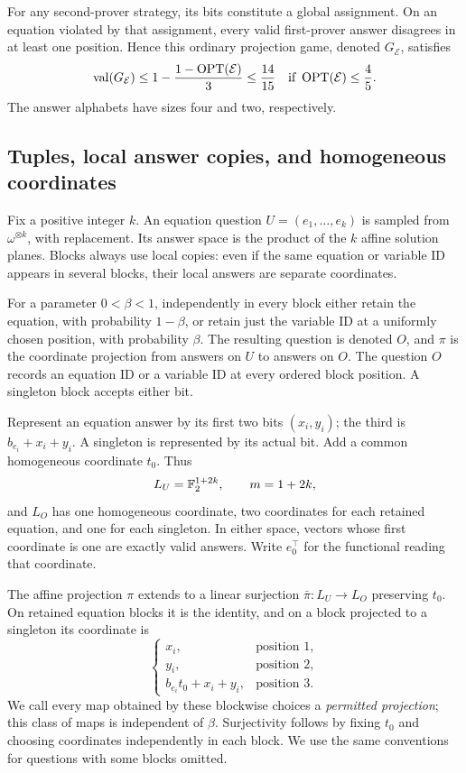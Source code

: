 For any second-prover strategy, its bits constitute a global assignment.
On an equation violated by that assignment, every valid first-prover
answer disagrees in at least one position.  Hence this ordinary
projection game, denoted \(G_{\mathcal E}\), satisfies
\begin{equation}
 \operatorname{val}(G_{\mathcal E})
 \le 1-\frac{1-\operatorname{OPT}(\mathcal E)}3
 \le \frac{14}{15}
 \quad\text{if }\operatorname{OPT}(\mathcal E)\le\frac45.
 \label{eq:base-game-gap}
\end{equation}
The answer alphabets have sizes four and two, respectively.

\subsection{Tuples, local answer copies, and homogeneous coordinates}

Fix a positive integer \(k\).  An equation question
\(U=(e_1,\ldots,e_k)\) is sampled from \(\omega^{\otimes k}\), with
replacement.  Its answer space is the product of the \(k\) affine
solution planes.  Blocks always use local copies: even if the same
equation or variable ID appears in several blocks, their local answers
are separate coordinates.

For a parameter \(0<\beta<1\), independently in every block either
retain the equation, with probability \(1-\beta\), or retain just the
variable ID at a uniformly chosen position, with probability \(\beta\).
The resulting question is denoted \(O\), and \(\pi\) is the
coordinate projection from answers on \(U\) to answers on \(O\).
The question \(O\) records an equation ID or a variable ID at every
ordered block position.  A singleton block accepts either bit.

Represent an equation answer by its first two bits \((x_i,y_i)\);
the third is \(b_{e_i}+x_i+y_i\).  A singleton is represented by its
actual bit.  Add a common homogeneous coordinate \(t_0\).  Thus
\[
 L_U=\mathbb F_2^{1+2k},\qquad m=1+2k,
\]
and \(L_O\) has one homogeneous coordinate, two coordinates for each
retained equation, and one for each singleton.  In either space, vectors
whose first coordinate is one are exactly valid answers.  Write
\(e_0^\top\) for the functional reading that coordinate.

The affine projection \(\pi\) extends to a linear surjection
\(\bar\pi:L_U\to L_O\) preserving \(t_0\).  On retained equation
blocks it is the identity, and on a block projected to a singleton its
coordinate is
\begin{equation}
 \begin{cases}
 x_i,&\text{position }1,\\
 y_i,&\text{position }2,\\
 b_{e_i}t_0+x_i+y_i,&\text{position }3.
 \end{cases}
 \label{eq:outer-projection}
\end{equation}
We call every map obtained by these blockwise choices a \emph{permitted
projection}; this class of maps is independent of \(\beta\).
Surjectivity follows by fixing \(t_0\) and choosing coordinates
independently in each block.  We use the same conventions for questions
with some blocks omitted.

